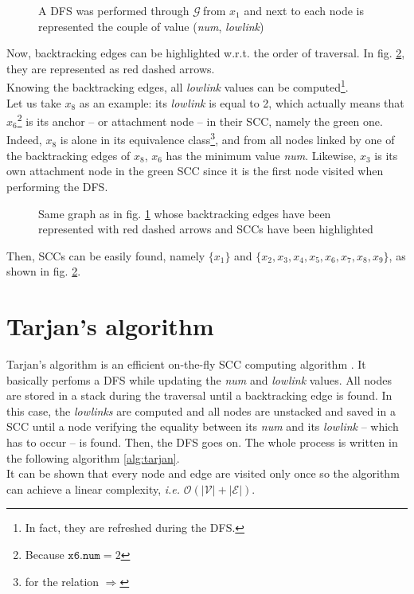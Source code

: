 \documentclass[a4 paper, 12pt]{article}
\theoremstyle{definition}
\def\GG{$\mathcal{G}~$}
\begin{document}
\begin{figure}[!h]
    \caption{A DFS was performed through \GG from $x_1$ and next to each node is represented the couple of value (\textit{num}, \textit{lowlink})\label{fig:exlowlink}}
\end{figure}

Now, backtracking edges can be highlighted w.r.t. the order of traversal. In fig. \ref{fig:exlowlink2}, they are represented as red dashed arrows.\\
Knowing the backtracking edges, all \textit{lowlink} values can be computed\footnote{In fact, they are refreshed during the DFS.}.\\
Let us take $x_8$ as an example: its \textit{lowlink} is equal to 2, which actually means that $x_6$\footnote{Because $\texttt{x6.num} = 2$} is its anchor -- or attachment node -- in their SCC, namely the green one. Indeed, $x_8$ is alone in its equivalence class\footnote{for the relation $\Rightarrow$}, and from all nodes linked by one of the backtracking edges of $x_8$, $x_6$ has the minimum value \textit{num}. Likewise, $x_3$ is its own attachment node in the green SCC since it is the first node visited when performing the DFS.

\begin{figure}[!h]
    \caption{Same graph as in fig. \ref{fig:exlowlink} whose backtracking edges have been represented with red dashed arrows and SCCs have been highlighted\label{fig:exlowlink2}}
\end{figure}

Then, SCCs can be easily found, namely $\{x_1\}$ and $\{x_2,x_3,x_4,x_5,x_6,x_7,x_8, x_9\}$, as shown in fig. \ref{fig:exlowlink2}.

\pagebreak
\section{Tarjan's algorithm}
Tarjan's algorithm is an efficient on-the-fly SCC computing algorithm \cite{tarjanMerz}. It basically perfoms a DFS while updating the \textit{num} and \textit{lowlink} values. All nodes are stored in a stack during the traversal until a backtracking edge is found. In this case, the \textit{lowlinks} are computed and all nodes are unstacked and saved in a SCC until a node verifying the equality between its \textit{num} and its \textit{lowlink} -- which has to occur -- is found. Then, the DFS goes on. The whole process is written in the following algorithm \ref{alg:tarjan}.\\
It can be shown that every node and edge are visited only once so the algorithm can achieve a linear complexity, \textit{i.e.} $\mathcal{O}(|\mathcal{V}|+|\mathcal{E}|)$.
\end{document}
